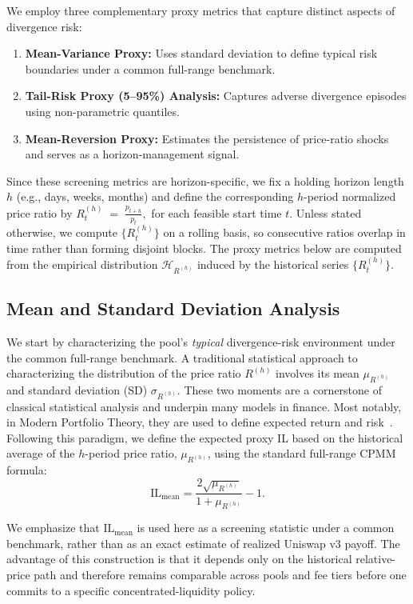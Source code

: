 \documentclass[anonymous]{lipics-v2021}
\begin{document}
{We employ three complementary proxy metrics that capture distinct aspects of divergence risk:}
\begin{enumerate}
    \item \textbf{{Mean-Variance Proxy:}} {Uses standard deviation to define typical risk boundaries under a common full-range benchmark.}
    \item \textbf{{Tail-Risk Proxy (5--95\%) Analysis:}} {Captures adverse divergence episodes using non-parametric quantiles.}
    \item \textbf{{Mean-Reversion Proxy:}} {Estimates the persistence of price-ratio shocks and serves as a horizon-management signal.}
\end{enumerate}

{Since these screening metrics are horizon-specific, we fix a holding horizon length $h$ (e.g., days, weeks, months) and define the corresponding $h$-period normalized price ratio by}
\(
    R^{(h)}_{t} \;=\; \frac{p_{t+h}}{p_t},
\)
{for each feasible start time $t$. Unless stated otherwise, we compute $\{R^{(h)}_{t}\}$ on a rolling basis, so consecutive ratios overlap in time rather than forming disjoint blocks. The proxy metrics below are computed from the empirical distribution $\mathcal{H}_{R^{(h)}}$ induced by the historical series $\{R^{(h)}_{t}\}$.}

\subsection{Mean and Standard Deviation Analysis}
{We start by characterizing the pool’s \emph{typical} divergence-risk environment under the common full-range benchmark. A traditional statistical approach to characterizing the distribution of the price ratio \(R^{(h)}\) involves its mean \(\mu_{R^{(h)}}\) and standard deviation (SD) \(\sigma_{R^{(h)}}\). These two moments are a cornerstone of classical statistical analysis and underpin many models in finance. Most notably, in Modern Portfolio Theory, they are used to define expected return and risk~\cite{markowitz1952portfolio, ross2014introduction}. Following this paradigm, we define the expected proxy IL based on the historical average of the \(h\)-period price ratio, \(\mu_{R^{(h)}}\), using the standard full-range CPMM formula:}
\begin{equation}
\label{eq:il_mean}
\mathrm{IL}_{\text{mean}} = \frac{2\sqrt{\mu_{R^{(h)}}}}{1+\mu_{R^{(h)}}} - 1.
\end{equation}

{We emphasize that $\mathrm{IL}_{\text{mean}}$ is used here as a screening statistic under a common benchmark, rather than as an exact estimate of realized Uniswap v3 payoff. The advantage of this construction is that it depends only on the historical relative-price path and therefore remains comparable across pools and fee tiers before one commits to a specific concentrated-liquidity policy.}
\end{document}
